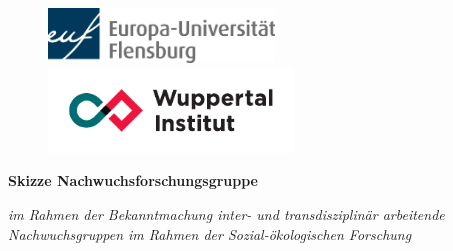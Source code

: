 
\thispagestyle{empty}
\begin{center}

\begin{figure}[htb]
    \centering
    \begin{minipage}[c]{0.4\linewidth}
        \centering
        \includegraphics[width=6.0cm]{logos/europa-universitaet-flensburg-hauptlogo-rgb-600dpi.png}
    \end{minipage}
    \hfill
    \begin{minipage}[c]{0.4\linewidth}
        \centering
        \includegraphics[width=6.5cm]{logos/WI_Logo_CMYK.pdf}
    \end{minipage}
\end{figure}

\vspace*{1 cm}

{\LARGE\textbf{\textsf{Skizze Nachwuchsforschungsgruppe}}

\textsf{\textit{im Rahmen der Bekanntmachung \glqq inter- und transdisziplinär arbeitende Nachwuchsgruppen im Rahmen der Sozial-ökologischen Forschung\grqq} }
}


\end{center}
